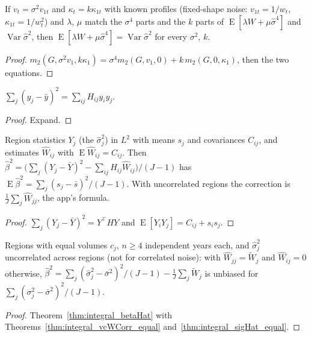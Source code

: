 \begin{theorem}\label{thm:integral_vcWCorr}
  \leanok
  If $v_t = \sigma^2v_{1t}$ and $\kappa_t = k\kappa_{1t}$ with known profiles (fixed-shape noise:
  $v_{1t} = 1/w_t$, $\kappa_{1t} = 1/w_t^2$) and $\lambda$, $\mu$ match the $\sigma^4$ parts and the $k$ parts
  of $\operatorname{E}[\lambda W + \mu\hat\sigma^4]$ and $\operatorname{Var}\hat\sigma^2$, then
  $\operatorname{E}[\lambda W + \mu\hat\sigma^4] = \operatorname{Var}\hat\sigma^2$ for every $\sigma^2$, $k$.
\end{theorem}
\begin{proof}
  \leanok
  $m_2(G, \sigma^2v_1, k\kappa_1) = \sigma^4m_2(G, v_1, 0) + k\,m_2(G, 0, \kappa_1)$, then the two equations.
\end{proof}

\begin{lemma}\label{lem:sum_sq_dev}
  \leanok
  $\sum_j(y_j - \bar y)^2 = \sum_{ij}H_{ij}y_iy_j$.
\end{lemma}
\begin{proof}
  \leanok
  Expand.
\end{proof}

\begin{theorem}\label{thm:integral_betaHat}
  \leanok
  Region statistics $Y_j$ (the $\hat\sigma_j^2$) in $L^2$ with means $s_j$ and covariances $C_{ij}$, and
  estimates $\hat W_{ij}$ with $\operatorname{E}\hat W_{ij} = C_{ij}$. Then
  $\hat\beta^2 = \bigl(\sum_j(Y_j - \bar Y)^2 - \sum_{ij}H_{ij}\hat W_{ij}\bigr)/(J-1)$ has
  $\operatorname{E}\hat\beta^2 = \sum_j(s_j - \bar s)^2/(J-1)$. With uncorrelated regions the correction is
  $\frac1J\sum_j\hat W_{jj}$, the app's formula.
\end{theorem}
\begin{proof}
  \leanok
  $\sum_j(Y_j - \bar Y)^2 = Y^\top HY$ and $\operatorname{E}[Y_iY_j] = C_{ij} + s_is_j$.
\end{proof}

\begin{theorem}\label{thm:integral_betaHat_equal}
  \leanok
  Regions with equal volumes $c_j$, $n \ge 4$ independent years each, and $\hat\sigma_j^2$ uncorrelated
  across regions (not for correlated noise): with $\hat W_{jj} = \tilde W_j$ and $\hat W_{ij} = 0$ otherwise,
  $\hat\beta^2 = \sum_j(\hat\sigma_j^2 - \bar\sigma^2)^2/(J-1) - \frac1J\sum_j\tilde W_j$ is unbiased for
  $\sum_j(\sigma_j^2 - \bar\sigma^2)^2/(J-1)$.
\end{theorem}
\begin{proof}
  \leanok
  Theorem~\ref{thm:integral_betaHat} with Theorems~\ref{thm:integral_vcWCorr_equal} and~\ref{thm:integral_sigHat_equal}.
\end{proof}

